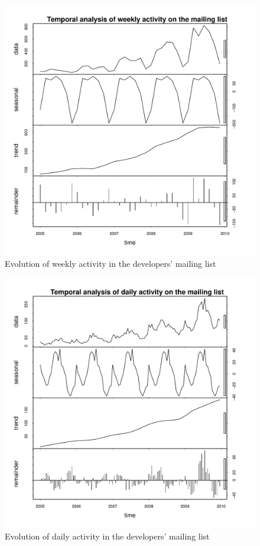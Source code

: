 \begin{figure}[!hptb]
\includegraphics[width=400pt]{images/messagesByDay.pdf}
\caption{Evolution of weekly activity in the developers' mailing list}
\label{mails:evo:weekly}
\end{figure}

\begin{figure}[!hptb]
\includegraphics[width=400pt]{images/messagesByHour.pdf}
\caption{Evolution of daily activity in the developers' mailing list}
\label{mails:evo:daily}
\end{figure}

